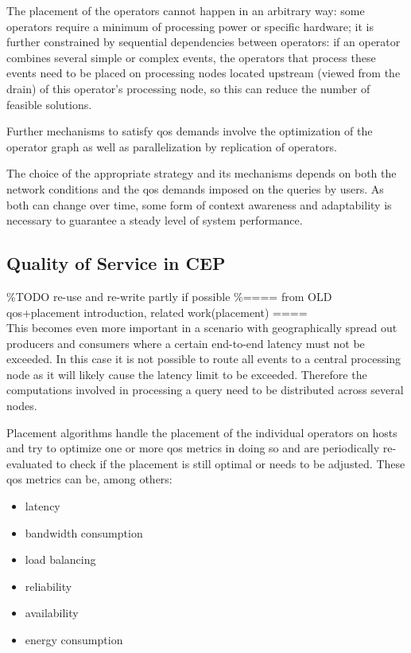 The placement of the operators cannot happen in an arbitrary way: some operators require a minimum of processing power or specific hardware; it is further constrained by sequential dependencies between operators: if an operator combines several simple or complex events, the operators that process these events need to be placed on processing nodes located upstream (viewed from the drain) of this operator's processing node, so this can reduce the number of feasible solutions. 

Further mechanisms to satisfy \gls{qos} demands involve the optimization of the operator graph as well as parallelization by replication of operators.

The choice of the appropriate strategy and its mechanisms depends on both the network conditions and the \gls{qos} demands imposed on the queries by users. As both can change over time, some form of context awareness and adaptability is necessary to guarantee a steady level of system performance.


\subsection{Quality of Service in CEP}



\%TODO re-use and re-write partly if possible
\%==== from OLD \gls{qos}+placement introduction, related work(placement) ====\\
This becomes even more important in a scenario with geographically spread out producers and consumers where a certain end-to-end latency must not be exceeded. In this case it is not possible to route all events to a central processing node as it will likely cause the latency limit to be exceeded. Therefore the computations involved in processing a query need to be distributed across several nodes.

Placement algorithms handle the placement of the individual operators on hosts and try to optimize one or more \gls{qos} metrics in doing so and are periodically re-evaluated to check if the placement is still optimal or needs to be adjusted. 
These \gls{qos} metrics can be, among others: 
\begin{itemize}
\item latency 
\item bandwidth consumption
\item load balancing
\item reliability
\item availability
\item energy consumption
\end{itemize}

